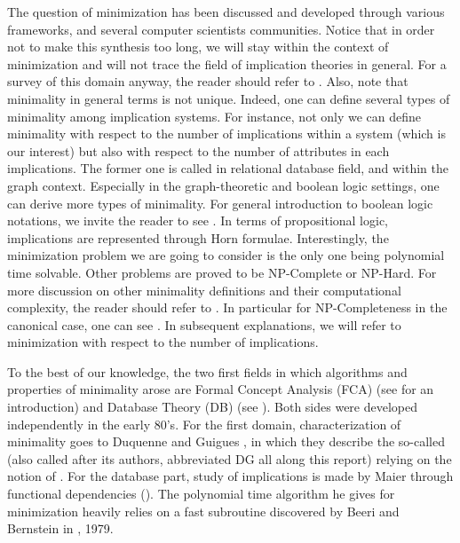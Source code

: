 The question of minimization has been discussed and developed through various 
frameworks, and several computer scientists communities. Notice that in order 
not to make this synthesis too long, we will stay within the context of 
minimization and will not trace the field of implication theories in general. 
For a survey of this domain anyway, the reader should refer to 
\cite{wild_joy_2017}. Also, note that minimality in general terms is not 
unique. Indeed, one can define several types of minimality among implication 
systems. For instance, not only we can define minimality with respect to the 
number of implications within a system (which is our interest) but also with 
respect to the number of attributes in each implications. The former one is 
called  in relational database field, and  within the graph context. Especially in the graph-theoretic and 
boolean logic settings, one can derive more types of minimality. For general 
introduction to boolean logic notations, we invite the reader to see 
\cite{cori_mathematical_2000}. In terms of propositional logic, implications 
are represented through Horn formulae. Interestingly, the minimization problem 
we are going to consider is the only one being polynomial time solvable. Other 
problems are proved to be NP-Complete or NP-Hard. For more discussion on other 
minimality definitions and their computational complexity, the reader should 
refer to \cite{boros_strong_2017, ausiello_directed_2017, 
	ganter_conceptual_2016, ausiello_minimal_1986, wild_joy_2017, 
	boros_horn_1998}. In particular for NP-Completeness in the canonical case, 
	one 
can see \cite{hammer_optimal_1993}. In subsequent explanations, we will refer 
to minimization with respect to the number of implications.

\vspace{1.2em}

To the best of our knowledge, the two first fields in which algorithms and 
properties of minimality arose are Formal Concept Analysis (FCA) (see 
\cite{ganter_formal_1999, 
	ganter_two_2010} for an introduction) and Database Theory (DB) (see 
\cite{maier_theory_1983}). Both sides were developed independently in the early 
80's. For the first domain, characterization of minimality goes to Duquenne and 
Guigues \cite{guigues_familles_1986}, in which they describe the so-called 
 (also called  after its 
authors, abbreviated DG all along this report) relying on the notion of . For the database part, study of implications is made by Maier through functional dependencies (\cite{maier_theory_1983, maier_minimum_1980}). The polynomial time algorithm he gives for minimization heavily relies on a fast subroutine discovered by Beeri and Bernstein in \cite{beeri_computational_1979}, 1979.

